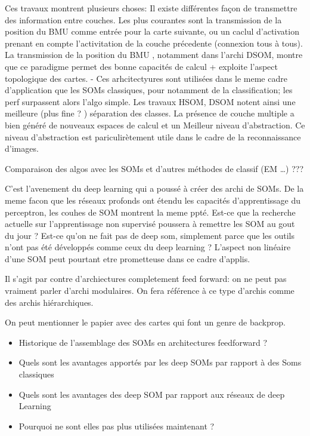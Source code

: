 \documentclass[../main]{subfiles}
\begin{document}
Ces travaux montrent plusieurs choses:
Il existe différentes façon de transmettre des information entre couches. Les plus courantes sont la transmission de la position du BMU comme entrée pour la carte suivante, ou un caclul d'activation prenant en compte l'activitation de la couche précedente (connexion tous à tous).
La transmission de la position du BMU , notamment dans l'archi DSOM, montre que ce paradigme permet des bonne capacités de calcul + exploite l'aspect topologique des cartes.
- Ces arhcitectyures sont utilisées dans le meme cadre d'application que les SOMs classiques, pour notamment de la classification; les perf surpassent alors l'algo simple. Les travaux HSOM, DSOM notent ainsi une meilleure (plus fine ? ) séparation des classes. La présence de couche multiple a bien généré de nouveaux espaces de calcul et un Meilleur niveau d'abstraction. Ce niveau d'abstraction est pariculirètement utile dans le cadre de la reconnaissance d'images.

Comparaison des algos avec les SOMs et d'autres méthodes de classif (EM …) ???

C'est l'avenement du deep learning qui a poussé à créer des archi de SOMs. De la meme facon que les réseaux profonds ont étendu les capacités d'apprentissage du perceptron, les couhes de SOM montrent la meme ppté.
 Est-ce que la recherche actuelle sur l'apprentissage non supervisé poussera à remettre les SOM au gout du jour ? Est-ce qu'on ne fait pas de deep som, simplement parce que les outils n'ont pas été développés comme ceux du deep learning ? L'aspect non linéaire d'une SOM peut pourtant etre prometteuse dans ce cadre d'applis.

Il s'agit par contre d'archiectures completement feed forward: on ne peut pas vraiment parler d'archi modulaires.
On fera référence à ce type d'archis comme des archis hiérarchiques.

On peut mentionner le papier avec des cartes qui font un genre de backprop.


\begin{itemize}
    \item Historique de l'assemblage des SOMs en architectures feedforward ? 
    \item Quels sont les avantages apportés par les deep SOMs par rapport à des Soms classiques
    \item Quels sont les avantages des deep SOM par rapport aux réseaux de deep Learning 
    \item Pourquoi ne sont elles pas plus utilisées maintenant ?
\end{itemize}
\end{document}
